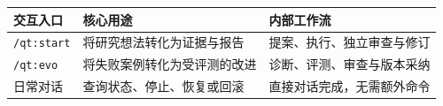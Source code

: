 \begin{tabular}{@{}P{3.0cm}P{4.6cm}P{4.9cm}@{}}
\toprule
\textbf{交互入口} & \textbf{核心用途} & \textbf{内部工作流} \\
\midrule
\texttt{/qt:start} & 将研究想法转化为证据与报告 & 提案、执行、独立审查与修订 \\
\texttt{/qt:evo} & 将失败案例转化为受评测的改进 & 诊断、评测、审查与版本采纳 \\
日常对话 & 查询状态、停止、恢复或回滚 & 直接对话完成，无需额外命令 \\
\bottomrule
\end{tabular}
